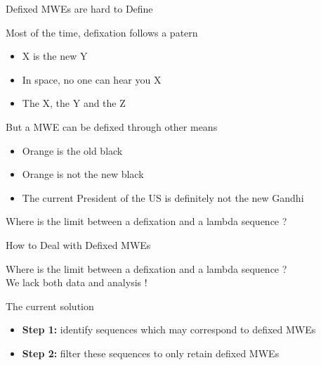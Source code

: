 \documentclass[serif, aspectratio=169]{beamer}
\begin{document}
\begin{frame}{Defixed MWEs are hard to Define}%
    \begin{block}{Most of the time, defixation follows a patern \citep{}}
        \begin{itemize}
            \item X is the new Y
            \item In space, no one can hear you X
            \item The X, the Y and the Z
        \end{itemize}
    \end{block}
    \vfill
    \begin{block}{But a MWE can be defixed through other means}
        \begin{itemize}
            \item Orange is the old black
            \item Orange is not the new black
            \item The current President of the US is definitely not the new Gandhi
        \end{itemize}
    \end{block}
    \vfill
    \begin{center}
        \Large
        Where is the limit between a defixation and a lambda sequence ?
    \end{center}
\end{frame}

\begin{frame}{How to Deal with Defixed MWEs}
    \begin{center}
        \Large
        Where is the limit between a defixation and a lambda sequence ? \\
        \vspace{10pt}
        We lack both data and analysis !
    \end{center}
    \vfill
    \begin{block}{The current solution}
        \begin{itemize}
            \item \textbf{Step 1:} identify sequences which may correspond to defixed MWEs
            \item \textbf{Step 2:} filter these sequences to only retain defixed MWEs
        \end{itemize}
    \end{block}
\end{frame}
\end{document}

